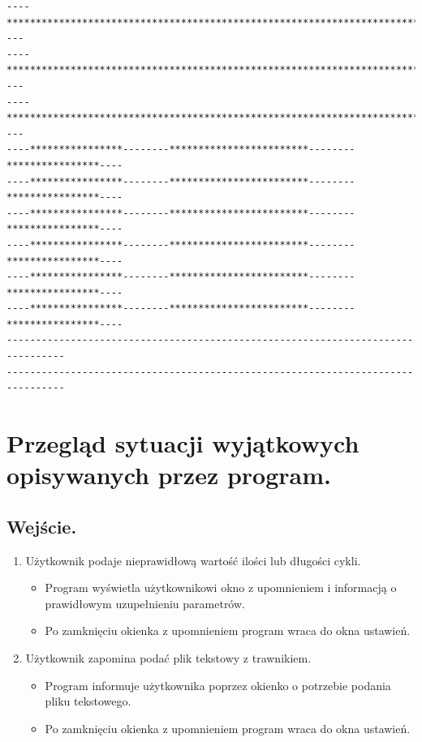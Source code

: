 \documentclass[a4paper]{article}
\begin{document}
\begin{verbatim}
----************************************************************************----
----************************************************************************----
----************************************************************************----
----****************--------************************--------****************----
----****************--------************************--------****************----
----****************--------************************--------****************----
----****************--------************************--------****************----
----****************--------************************--------****************----
----****************--------************************--------****************----
--------------------------------------------------------------------------------
--------------------------------------------------------------------------------
\end{verbatim}
\newpage

\section{Przegląd sytuacji wyjątkowych opisywanych przez program.}
\subsection{Wejście.}
\begin{enumerate}
    \item Użytkownik podaje nieprawidłową wartość ilości lub długości cykli.
          \begin{itemize}
              \item Program wyświetla użytkownikowi okno z upomnieniem i informacją o prawidłowym uzupełnieniu parametrów.
              \item Po zamknięciu okienka z upomnieniem program wraca do okna ustawień.
          \end{itemize}
    \item Użytkownik zapomina podać plik tekstowy z trawnikiem.
          \begin{itemize}
              \item Program informuje użytkownika poprzez okienko o potrzebie podania pliku tekstowego.
              \item Po zamknięciu okienka z upomnieniem program wraca do okna ustawień.
          \end{itemize}
\end{enumerate}
\end{document}
